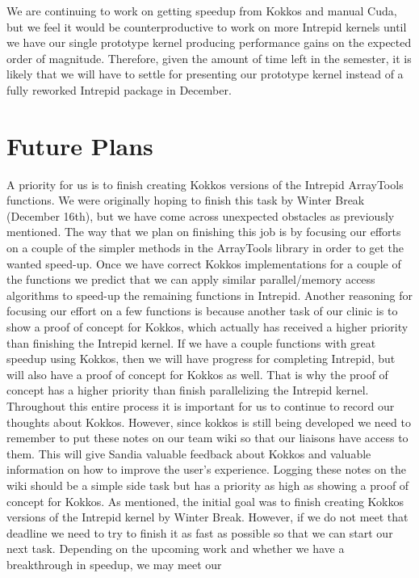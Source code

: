 \documentclass{hmcclinic}
\begin{document}
We are continuing to work on getting speedup from Kokkos and manual Cuda, but
we feel it would be counterproductive to work on more Intrepid kernels until we
have our single prototype kernel producing performance gains on the expected
order of magnitude.  Therefore, given the amount of time left in the semester,
it is likely that we will have to settle for presenting our prototype kernel
instead of a fully reworked Intrepid package in December. 

\section*{Future Plans}
A priority for us is to finish creating Kokkos versions of the Intrepid ArrayTools functions. 
We were originally hoping to finish this task by Winter Break (December 16th), but we have 
come across unexpected obstacles as previously mentioned. The way that we plan on finishing 
this job is by focusing our efforts on a couple of the simpler methods in the ArrayTools library 
in order to get the wanted speed-up. Once we have correct Kokkos implementations for a couple of
the functions we predict that we can apply similar parallel/memory access algorithms to speed-up
the remaining functions in Intrepid. Another reasoning for focusing our effort on a few functions
is because another task of our clinic is to show a proof of concept for Kokkos, which actually
has received a higher priority than finishing the Intrepid kernel. If we have a couple functions 
with great speedup using Kokkos, then we will have progress for completing Intrepid, but will also 
have a proof of concept for Kokkos as well. That is why the proof of concept has a higher priority 
than finish parallelizing the Intrepid kernel. Throughout this entire process it is important for 
us to continue to record our thoughts about Kokkos. However, since kokkos is still being developed
we need to remember to put these notes on our team wiki so that our liaisons have access to them. 
This will give Sandia valuable feedback about Kokkos and valuable information on how to improve the
user's experience. Logging these notes on the wiki should be a simple side task but has a priority
as high as showing a proof of concept for Kokkos. As mentioned, the initial goal was to finish 
creating Kokkos versions of the Intrepid kernel by Winter Break. However, if we do not meet that 
deadline we need to try to finish it as fast as possible so that we can start our next task. 
Depending on the upcoming work and whether we have a breakthrough in speedup, we may meet our 
\end{document}
